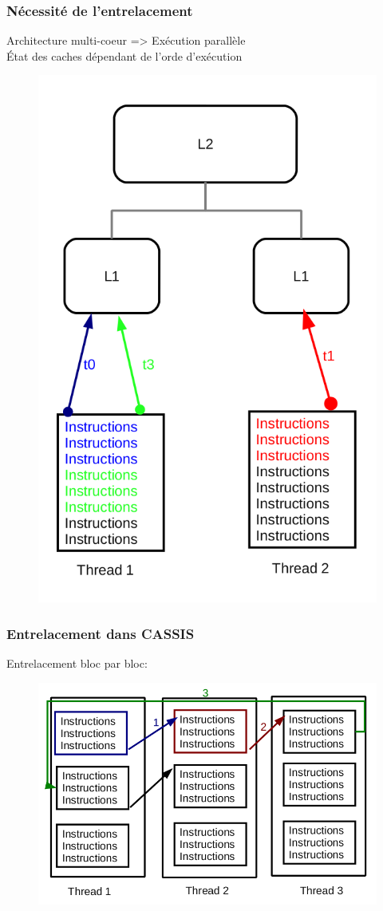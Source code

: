 
\begin{frame}
 \frametitle{Nécessité de l'entrelacement}
 Architecture multi-coeur => Exécution parallèle\\
 \'Etat des caches dépendant de l'orde d'exécution
 \begin{figure}
   \includegraphics[scale=0.3]{images/schema_entrelacement.png}
 \end{figure}
\end{frame}

\begin{frame}
 \frametitle{Entrelacement dans CASSIS}
 Entrelacement bloc par bloc:
 \begin{figure}
   \includegraphics[scale=0.4]{images/schema_lua.png}
 \end{figure}
\end{frame}
